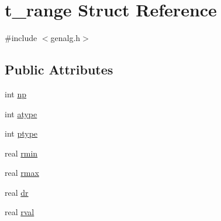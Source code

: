\hypertarget{structt__range}{\section{t\-\_\-range \-Struct \-Reference}
\label{structt__range}
}


{\ttfamily \#include $<$genalg.\-h$>$}

\subsection*{\-Public \-Attributes}
\begin{DoxyCompactItemize}
\item 
int \hyperlink{structt__range_a56023430c93da3ae70a7864249502bea}{np}
\item 
int \hyperlink{structt__range_a7cc1b17de72e8072f62be57f9a387603}{atype}
\item 
int \hyperlink{structt__range_aaf96fe867f530225822c065d30dee823}{ptype}
\item 
real \hyperlink{structt__range_a2366bd0a3838d1e98eb7902b6fa729ab}{rmin}
\item 
real \hyperlink{structt__range_ab6934f287bde92940fea33d8a4c64f80}{rmax}
\item 
real \hyperlink{structt__range_a0283c09c998e2c5911493cafdad2ced4}{dr}
\item 
real \hyperlink{structt__range_a776b418fd21da7c1f31b9271bc51520d}{rval}
\end{DoxyCompactItemize}


